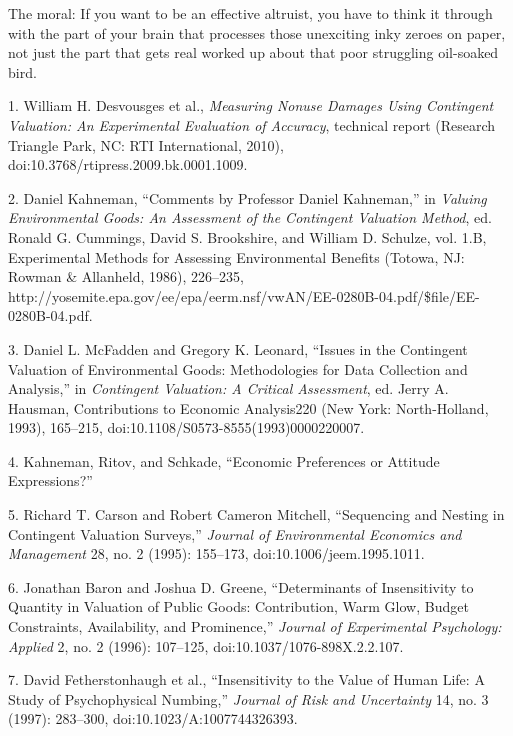 {
 The moral: If you want to be an effective altruist, you have to
think it through with the part of your brain that processes those
unexciting inky zeroes on paper, not just the part that gets real
worked up about that poor struggling oil-soaked bird.}

\myendsectiontext


\bigskip

{
 1. William H. Desvousges et al., \textit{Measuring Nonuse Damages
Using Contingent Valuation: An Experimental Evaluation of Accuracy},
technical report (Research Triangle Park, NC: RTI International, 2010),
doi:10.3768/rtipress.2009.bk.0001.1009.}

{
 2. Daniel Kahneman, ``Comments by Professor
Daniel Kahneman,'' in \textit{Valuing Environmental
Goods: An Assessment of the Contingent Valuation Method}, ed. Ronald G.
Cummings, David S. Brookshire, and William D. Schulze, vol. 1.B,
Experimental Methods for Assessing Environmental Benefits (Totowa, NJ:
Rowman \& Allanheld, 1986), 226--235,
http://yosemite.epa.gov/ee/epa/eerm.nsf/vwAN/EE-0280B-04.pdf/\$file/EE-0280B-04.pdf.}

{
 3. Daniel L. McFadden and Gregory K. Leonard,
``Issues in the Contingent Valuation of Environmental
Goods: Methodologies for Data Collection and
Analysis,'' in \textit{Contingent Valuation: A
Critical Assessment}, ed. Jerry A. Hausman, Contributions to Economic
Analysis220 (New York: North-Holland, 1993), 165--215,
doi:10.1108/S0573-8555(1993)0000220007.}

{
 4. Kahneman, Ritov, and Schkade, ``Economic
Preferences or Attitude Expressions?''}

{
 5. Richard T. Carson and Robert Cameron Mitchell,
``Sequencing and Nesting in Contingent Valuation
Surveys,'' \textit{Journal of Environmental Economics
and Management} 28, no. 2 (1995): 155--173,
doi:10.1006/jeem.1995.1011.}

{
 6. Jonathan Baron and Joshua D. Greene,
``Determinants of Insensitivity to Quantity in
Valuation of Public Goods: Contribution, Warm Glow, Budget Constraints,
Availability, and Prominence,'' \textit{Journal of
Experimental Psychology: Applied} 2, no. 2 (1996): 107--125,
doi:10.1037/1076-898X.2.2.107.}

{
 7. David Fetherstonhaugh et al., ``Insensitivity
to the Value of Human Life: A Study of Psychophysical
Numbing,'' \textit{Journal of Risk and Uncertainty}
14, no. 3 (1997): 283--300, doi:10.1023/A:1007744326393.}


